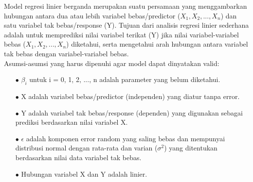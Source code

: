 \begin{sloppypar}
Model regresi linier berganda merupakan suatu persamaan yang menggambarkan hubungan antara dua atau lebih variabel bebas/predictor ($X_1, X_2, ..., X_n$) dan satu variabel tak bebas/response (Y). Tujuan dari analisis regresi linier sederhana adalah untuk memprediksi nilai variabel terikat (Y) jika nilai variabel-variabel bebas ($X_1, X_2, ..., X_n$) diketahui, serta mengetahui arah hubungan antara variabel tak bebas dengan variabel-variabel bebas.
\\Asumsi-asumsi yang harus dipenuhi agar model dapat dinyatakan valid:
\begin{enumerate}
    \item[$\bullet$] $\beta_i$ untuk i = 0, 1, 2, ..., n adalah parameter yang belum diketahui.
    \item[$\bullet$] X adalah variabel bebas/predictor (independen) yang diatur tanpa error.
    \item[$\bullet$] Y adalah variabel tak bebas/response (dependen) yang digunakan sebagai prediksi berdasarkan nilai variabel X.
    \item[$\bullet$] $\epsilon$ adalah komponen error random yang saling bebas dan mempunyai distribusi normal dengan rata-rata dan varian ($\sigma^2$) yang ditentukan berdasarkan nilai data variabel tak bebas.
    \item[$\bullet$] Hubungan variabel X dan Y adalah linier.
\end{enumerate}
\end{sloppypar}

